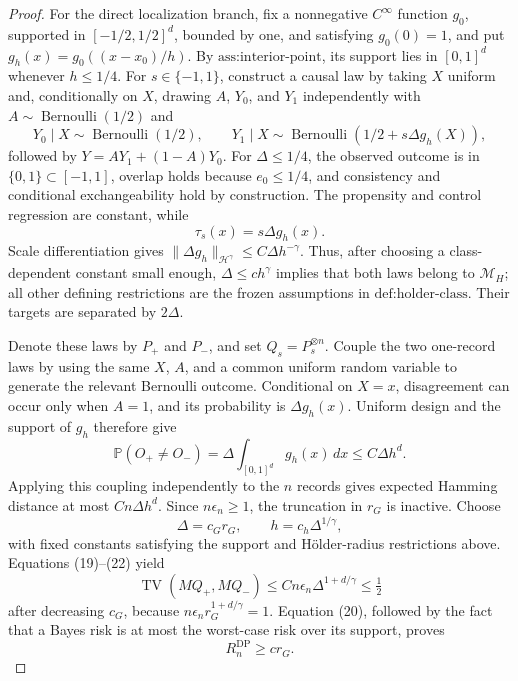 \documentclass{article}
\begin{document}
\begin{proof}
For the direct localization branch, fix a nonnegative \(C^\infty\) function \(g_0\), supported in \([-1/2,1/2]^d\), bounded by one, and satisfying \(g_0(0)=1\), and put \(g_h(x)=g_0((x-x_0)/h)\).  By \(\text{ass:interior-point}\), its support lies in \([0,1]^d\) whenever \(h\le1/4\).  For \(s\in\{-1,1\}\), construct a causal law by taking \(X\) uniform and, conditionally on \(X\), drawing \(A\), \(Y_0\), and \(Y_1\) independently with \(A\sim\operatorname{Bernoulli}(1/2)\) and
\[
 Y_0\mid X\sim\operatorname{Bernoulli}(1/2),
 \qquad
 Y_1\mid X\sim\operatorname{Bernoulli}(1/2+s\Delta g_h(X)),
\]
followed by \(Y=AY_1+(1-A)Y_0\).  For \(\Delta\le1/4\), the observed outcome is in \(\{0,1\}\subset[-1,1]\), overlap holds because \(e_0\le1/4\), and consistency and conditional exchangeability hold by construction.  The propensity and control regression are constant, while
\[
 \tau_s(x)=s\Delta g_h(x).
\]
Scale differentiation gives \(\|\Delta g_h\|_{\mathcal H^\gamma}\le C\Delta h^{-\gamma}\).  Thus, after choosing a class-dependent constant small enough, \(\Delta\le c h^\gamma\) implies that both laws belong to \(\mathcal M_H\); all other defining restrictions are the frozen assumptions in \(\text{def:holder-class}\).  Their targets are separated by \(2\Delta\).

Denote these laws by \(P_+\) and \(P_-\), and set \(Q_s=P_s^{\otimes n}\).  Couple the two one-record laws by using the same \(X\), \(A\), and a common uniform random variable to generate the relevant Bernoulli outcome.  Conditional on \(X=x\), disagreement can occur only when \(A=1\), and its probability is \(\Delta g_h(x)\).  Uniform design and the support of \(g_h\) therefore give
\[
 \mathbb P(O_+\ne O_-)
 =\Delta\int_{[0,1]^d}g_h(x)\,dx
 \le C\Delta h^d.                                                               \tag{21}
\]
Applying this coupling independently to the \(n\) records gives expected Hamming distance at most \(Cn\Delta h^d\).  Since \(n\epsilon_n\ge1\), the truncation in \(r_G\) is inactive.  Choose
\[
 \Delta=c_G r_G,
 \qquad h=c_h\Delta^{1/\gamma},                                                  \tag{22}
\]
with fixed constants satisfying the support and Hölder-radius restrictions above.  Equations (19)--(22) yield
\[
 \operatorname{TV}(MQ_+,MQ_-)
 \le Cn\epsilon_n\Delta^{1+d/\gamma}\le\tfrac12
\]
after decreasing \(c_G\), because \(n\epsilon_n r_G^{1+d/\gamma}=1\).  Equation (20), followed by the fact that a Bayes risk is at most the worst-case risk over its support, proves
\[
 R_n^{\mathrm{DP}}\ge c r_G.                                                     \tag{23}
\]


\end{proof}
\end{document}
